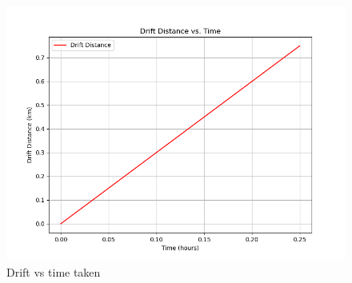 \documentclass[journal]{IEEEtran}
\begin{document}
\begin{figure}[h!]
   \centering
   \includegraphics[width=0.7\linewidth]{figures/Figure_2.png}
   \caption{Drift vs time taken}
   \label{graph}
\end{figure}
\end{document}
